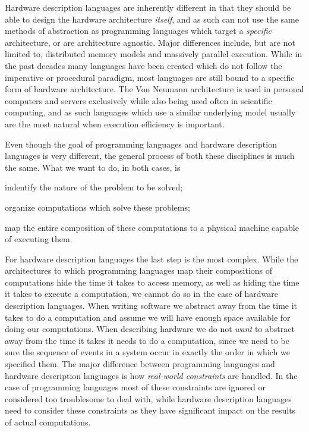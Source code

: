 Hardware description languages are inherently different in that they should be able to design the hardware architecture \textit{itself}, and as such can not use the same methods of abstraction as programming languages which target a \textit{specific} architecture, or are architecture agnostic.
Major differences include, but are not limited to, distributed memory models and massively parallel execution.
While in the past decades many languages have been created which do not follow the imperative or procedural paradigm, most languages are still bound to a specific form of hardware architecture.
The Von Neumann architecture is used in personal computers and servers exclusively while also being used often in scientific computing, and as such languages which use a similar underlying model usually are the most natural when execution efficiency is important.

Even though the goal of programming languages and hardware description languages is very different, the general process of both these disciplines is much the same.
What we want to do, in both cases, is  
\begin{inparaenum}
\item indentify the nature of the problem to be solved;
\item organize computations which solve these problems;
\item map the entire composition of these computations to a physical machine capable of executing them.
\end{inparaenum}

For hardware description languages the last step is the most complex.
While the architectures to which programming languages map their compositions of computations hide the time it takes to access memory, as well as hiding the time it takes to execute a computation, we cannot do so in the case of hardware description languages.
When writing software we abstract away from the time it takes to do a computation and assume we will have enough space available for doing our computations.
When describing hardware we do not \textit{want} to abstract away from the time it takes it needs to do a computation, since we need to be sure the sequence of events in a system occur in exactly the order in which we specified them.
The major difference between programming languages and hardware description languages is how \textit{real-world constraints} are handled. 
In the case of programming languages most of these constraints are ignored or considered too troublesome to deal with, while hardware description languages need to consider these constraints as they have significant impact on the results of actual computations.

